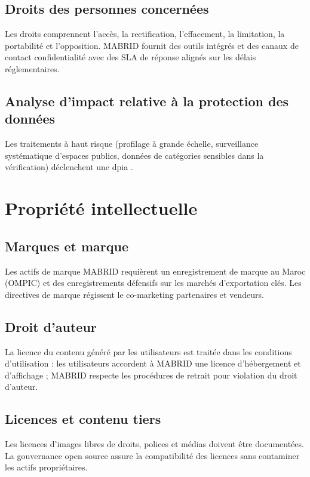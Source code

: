 \subsection{Droits des personnes concernées}

Les droits comprennent l'accès, la rectification, l'effacement, la limitation, la portabilité et l'opposition. MABRID fournit des outils intégrés et des canaux de contact confidentialité avec des SLA de réponse alignés sur les délais réglementaires.

\subsection{Analyse d'impact relative à la protection des données}

Les traitements à haut risque (profilage à grande échelle, surveillance systématique d'espaces publics, données de catégories sensibles dans la vérification) déclenchent une \gls{dpia} \parencite{euGDPRArt35}.

\section{Propriété intellectuelle}

\subsection{Marques et marque}

Les actifs de marque MABRID requièrent un enregistrement de marque au Maroc (OMPIC) et des enregistrements défensifs sur les marchés d'exportation clés. Les directives de marque régissent le co-marketing partenaires et vendeurs.

\subsection{Droit d'auteur}

La licence du contenu généré par les utilisateurs est traitée dans les conditions d'utilisation : les utilisateurs accordent à MABRID une licence d'hébergement et d'affichage ; MABRID respecte les procédures de retrait pour violation du droit d'auteur.

\subsection{Licences et contenu tiers}

Les licences d'images libres de droits, polices et médias doivent être documentées. La gouvernance open source assure la compatibilité des licences sans contaminer les actifs propriétaires.

